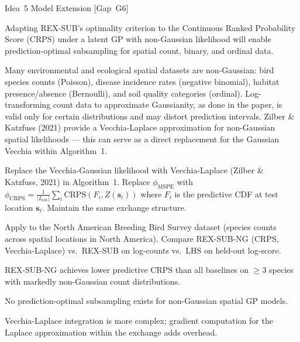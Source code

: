 \documentclass[12pt, a4paper]{article}
\newcommand{\novelty}[1]{\textbf{Novelty:} #1/5}
\newcommand{\feasibility}[1]{\textbf{Feasibility:} #1/5}
\begin{document}
\begin{ideabox}{Idea~5 \textbullet{} Model Extension [Gap~G6]}

\begin{description}[leftmargin=5em, labelwidth=4.5em]
  \item[\textbf{Hypothesis}]
    Adapting REX-SUB's optimality criterion to the Continuous Ranked Probability
    Score (CRPS) under a latent GP with non-Gaussian likelihood will enable
    prediction-optimal subsampling for spatial count, binary, and ordinal data.

  \item[\textbf{Motivation}]
    Many environmental and ecological spatial datasets are non-Gaussian: bird species
    counts (Poisson), disease incidence rates (negative binomial), habitat
    presence/absence (Bernoulli), and soil quality categories (ordinal).
    Log-transforming count data to approximate Gaussianity, as done in the paper,
    is valid only for certain distributions and may distort prediction intervals.
    Zilber \& Katzfuss (2021) provide a Vecchia-Laplace approximation for
    non-Gaussian spatial likelihoods --- this can serve as a direct replacement for
    the Gaussian Vecchia within Algorithm~1.

  \item[\textbf{Approach}]
    Replace the Vecchia-Gaussian likelihood with Vecchia-Laplace (Zilber \&
    Katzfuss, 2021) in Algorithm~1.  Replace $\phi_{\text{MSPE}}$ with
    $\phi_{\text{CRPS}} = \frac{1}{|I_{\text{test}}|}\sum_{i} \text{CRPS}(F_i,
    Z(\mathbf{s}_i))$ where $F_i$ is the predictive CDF at test location
    $\mathbf{s}_i$.  Maintain the same exchange structure.

  \item[\textbf{Key experiment}]
    Apply to the North American Breeding Bird Survey dataset (species counts across
    spatial locations in North America).  Compare REX-SUB-NG (CRPS, Vecchia-Laplace)
    vs.\ REX-SUB on log-counts vs.\ LHS on held-out log-score.

  \item[\textbf{Success criterion}]
    REX-SUB-NG achieves lower predictive CRPS than all baselines on $\geq 3$
    species with markedly non-Gaussian count distributions.

  \item[\novelty{5}]
    No prediction-optimal subsampling exists for non-Gaussian spatial GP models.

  \item[\feasibility{3}]
    Vecchia-Laplace integration is more complex; gradient computation for the
    Laplace approximation within the exchange adds overhead.
\end{description}

\end{ideabox}
\end{document}
